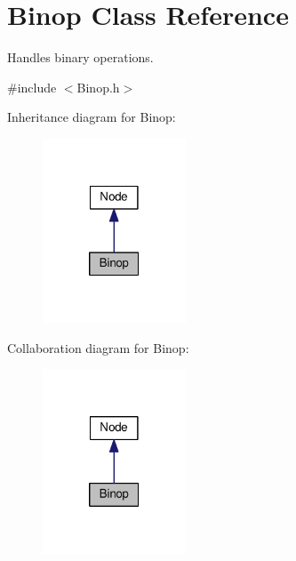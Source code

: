 \hypertarget{classBinop}{}\section{Binop Class Reference}
\label{classBinop}


Handles binary operations.  




{\ttfamily \#include $<$Binop.\+h$>$}



Inheritance diagram for Binop\+:
\nopagebreak
\begin{figure}[H]
\begin{center}
\leavevmode
\includegraphics[width=121pt]{classBinop__inherit__graph}
\end{center}
\end{figure}


Collaboration diagram for Binop\+:
\nopagebreak
\begin{figure}[H]
\begin{center}
\leavevmode
\includegraphics[width=121pt]{classBinop__coll__graph}
\end{center}
\end{figure}
